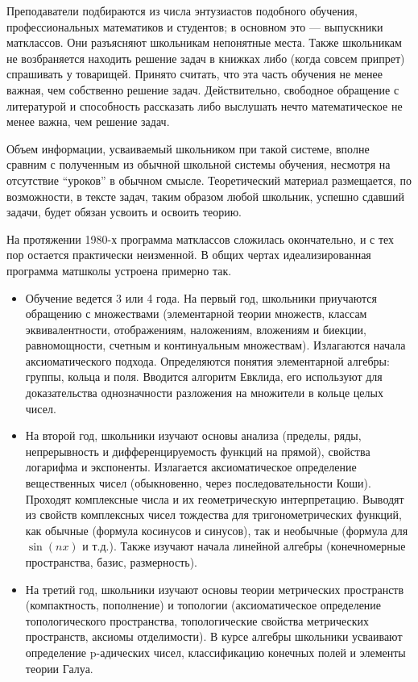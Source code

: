 \documentclass[12pt]{book}
\theoremstyle{upshape}
\theoremstyle{generic}
\theoremstyle{upshapenonumber}
\newcommand{\следствие}{%
     \refstepcounter{teorema}
     {\noindent\bf Следствие \thechapter.\arabic{teorema}:\ }}
\newcommand{\пример}{%
     \refstepcounter{teorema}
     {\noindent\bf Пример \thechapter.\arabic{teorema}:\ }}
\newcommand{\лемма}{%
     \refstepcounter{teorema}
     {\noindent\bf Лемма \thechapter.\arabic{teorema}:\ }}
\newcommand{\теорема}{%
     \refstepcounter{teorema}
     {\noindent\bf Теорема \thechapter.\arabic{teorema}:\ }}
\newcommand{\утверждение}{%
     \refstepcounter{teorema}
     {\noindent\bf Утверждение \thechapter.\arabic{teorema}:\ }}
\begin{document}
Преподаватели подбираются из числа энтузиастов 
подобного обучения, профессиональных математиков
и студентов; в основном это --- выпускники матклассов. 
Они разъясняют школьникам непонятные места.
Также школьникам не возбраняется находить
решение задач в книжках либо (когда совсем припрет)
спрашивать у товарищей. Принято считать, что эта часть
обучения не менее важная, чем собственно
решение задач. Действительно, свободное 
обращение с литературой и способность рассказать
либо выслушать нечто математическое не менее важна,
чем решение задач.

Объем информации, усваиваемый школьником при такой системе,
вполне сравним с полученным из обычной школьной
системы обучения, несмотря на отсутствие ``уроков''
в обычном смысле. Теоретический материал размещается,
по возможности, в тексте задач, таким образом любой
школьник, успешно сдавший задачи, будет обязан
усвоить и освоить теорию.

На протяжении 1980-х программа матклассов сложилась
окончательно, и с тех пор остается практически неизменной.
В общих чертах идеализированная программа 
матшколы устроена примерно так. 

\begin{itemize}
\item Обучение ведется 
3 или 4 года. На первый год, школьники приучаются
обращению с множествами (элементарной теории множеств,
классам эквивалентности, отображениям, наложениям, вложениям 
и биекции, равномощности, счетным и континуальным множествам). 
Излагаются начала аксиоматического подхода.
Определяются понятия элементарной алгебры: группы, кольца 
и поля. Вводится алгоритм Евклида, его используют
для доказательства однозначности разложения на
множители в кольце целых чисел.

\item На второй год, школьники
изучают основы анализа (пределы, ряды, непрерывность
и дифференцируемость функций на прямой),
свойства логарифма и экспоненты. Излагается аксиоматическое
определение вещественных чисел (обыкновенно, через 
последовательности Коши). Проходят комплексные числа
и их геометрическую интерпретацию. Выводят из свойств
комплексных чисел тождества для тригонометрических 
функций, как обычные (формула косинусов и синусов),
так и необычные (формула для $\sin(nx)$ и т.д.).
 Также изучают
начала линейной алгебры (конечномерные пространства,
базис, размерность).

\item На третий год, школьники изучают основы 
теории метрических пространств (компактность,
пополнение) и топологии (аксиоматическое определение
топологического пространства, топологические
свойства метрических пространств, аксиомы
отделимости). В курсе алгебры школьники
усваивают определение p-адических чисел, 
классификацию конечных полей и элементы 
теории Галуа.
\end{itemize}
\end{document}
